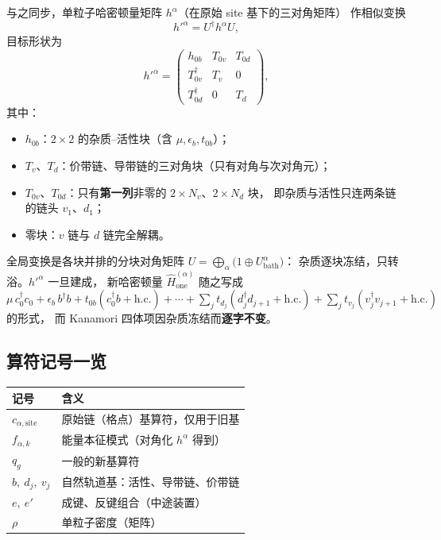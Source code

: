 \documentclass[11pt]{ctexart}
\begin{document}
与之同步，单粒子哈密顿量矩阵 $h^\alpha$（在原始 site 基下的三对角矩阵）
作相似变换
\[
h'^{\alpha}=U^{\dagger}h^{\alpha}U,
\]
目标形状为
\[
h'^{\alpha}
=
\begin{pmatrix}
h_{0b} & T_{0v} & T_{0d}\\[2pt]
T_{0v}^\dagger & T_v & 0\\[2pt]
T_{0d}^\dagger & 0 & T_d
\end{pmatrix},
\]
其中：
\begin{itemize}
\item $h_{0b}$：$2\times2$ 的杂质--活性块（含 $\mu,\epsilon_b,t_{0b}$）；
\item $T_v$、$T_d$：价带链、导带链的三对角块（只有对角与次对角元）；
\item $T_{0v}$、$T_{0d}$：只有\textbf{第一列}非零的 $2\times N_v$、$2\times N_d$ 块，
即杂质与活性只连两条链的链头 $v_1$、$d_1$；
\item 零块：$v$ 链与 $d$ 链完全解耦。
\end{itemize}

全局变换是各块并排的分块对角矩阵
$U=\bigoplus_\alpha\big(1\oplus U^\alpha_{\mathrm{bath}}\big)$：
杂质逐块冻结，只转浴。$h'^{\alpha}$ 一旦建成，
新哈密顿量 $\hat H_{\mathrm{one}}^{(\alpha)}$ 随之写成
$\mu\,c_0^\dagger c_0+\epsilon_b\,b^\dagger b+t_{0b}(c_0^\dagger b+\mathrm{h.c.})
+\cdots+\sum_j t_{d_j}(d_j^\dagger d_{j+1}+\mathrm{h.c.})
+\sum_j t_{v_j}(v_j^\dagger v_{j+1}+\mathrm{h.c.})$ 的形式，
而 Kanamori 四体项因杂质冻结而\textbf{逐字不变}。

\subsection{算符记号一览}

\begin{center}
\begin{tabular}{ll}
\toprule
记号 & 含义\\
\midrule
$c_{\alpha,\mathrm{site}}$ & 原始链（格点）基算符，仅用于旧基\\
$f_{\alpha,k}$ & 能量本征模式（对角化 $h^\alpha$ 得到）\\
$q_g$ & 一般的新基算符\\
$b,\ d_j,\ v_j$ & 自然轨道基：活性、导带链、价带链\\
$e,\ e'$ & 成键、反键组合（中途装置）\\
$\rho$ & 单粒子密度（矩阵）\\
\bottomrule
\end{tabular}
\end{center}
\end{document}
